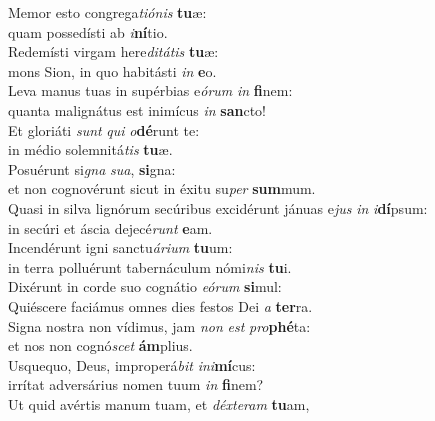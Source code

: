\evenverse Memor esto congrega\textit{ti}\textit{ó}\textit{nis} \textbf{tu}æ:~\*\\
\evenverse quam possedísti ab \textit{i}\textbf{ní}tio.\\
\oddverse Redemísti virgam here\textit{di}\textit{tá}\textit{tis} \textbf{tu}æ:~\*\\
\oddverse mons Sion, in quo habitásti \textit{in} \textbf{e}o.\\
\evenverse Leva manus tuas in supérbias e\textit{ó}\textit{rum} \textit{in} \textbf{fi}nem:~\*\\
\evenverse quanta malignátus est inimícus \textit{in} \textbf{san}cto!\\
\oddverse Et gloriáti \textit{sunt} \textit{qui} \textit{o}\textbf{dé}runt te:~\*\\
\oddverse in médio solemnitá\textit{tis} \textbf{tu}æ.\\
\evenverse Posuérunt si\textit{gna} \textit{su}\textit{a}, \textbf{si}gna:~\*\\
\evenverse et non cognovérunt sicut in éxitu su\textit{per} \textbf{sum}mum.\\
\oddverse Quasi in silva lignórum secúribus excidérunt jánuas e\textit{jus} \textit{in} \textit{i}\textbf{dí}psum:~\*\\
\oddverse in secúri et áscia dejecé\textit{runt} \textbf{e}am.\\
\evenverse Incendérunt igni sanctu\textit{á}\textit{ri}\textit{um} \textbf{tu}um:~\*\\
\evenverse in terra polluérunt tabernáculum nómi\textit{nis} \textbf{tu}i.\\
\oddverse Dixérunt in corde suo cognátio \textit{e}\textit{ó}\textit{rum} \textbf{si}mul:~\*\\
\oddverse Quiéscere faciámus omnes dies festos Dei \textit{a} \textbf{ter}ra.\\
\evenverse Signa nostra non vídimus, jam \textit{non} \textit{est} \textit{pro}\textbf{phé}ta:~\*\\
\evenverse et nos non cognó\textit{scet} \textbf{ám}plius.\\
\oddverse Usquequo, Deus, improperá\textit{bit} \textit{i}\textit{ni}\textbf{mí}cus:~\*\\
\oddverse irrítat adversárius nomen tuum \textit{in} \textbf{fi}nem?\\
\evenverse Ut quid avértis manum tuam, et \textit{déx}\textit{te}\textit{ram} \textbf{tu}am,~\*\\
